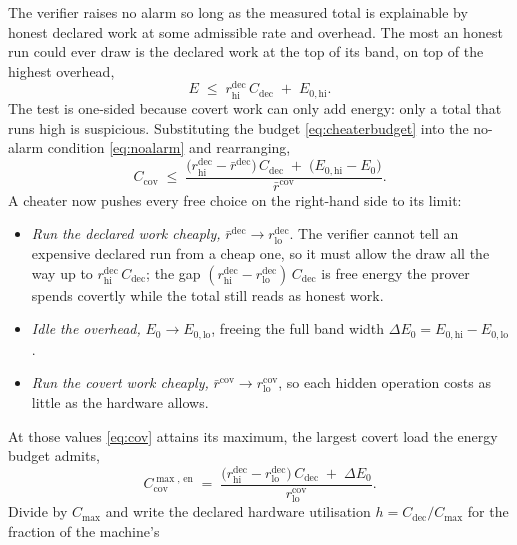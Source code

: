\documentclass{article}
\theoremstyle{plain}
\theoremstyle{definition}
\theoremstyle{remark}
\begin{document}
The verifier raises no alarm so long as the measured total is explainable by
honest declared work at some admissible rate and overhead. The most an
honest run could ever draw is the declared work at the top of its band, on
top of the highest overhead,
\begin{equation}
	E \;\le\; r_{\mathrm{hi}}^{\mathrm{dec}}\,C_{\mathrm{dec}} \;+\; E_{0,\mathrm{hi}}.
	\label{eq:noalarm}
\end{equation}
The test is one-sided because covert work can only add energy: only a
total that runs high is suspicious.
Substituting the budget \cref{eq:cheaterbudget} into the no-alarm condition
\cref{eq:noalarm} and rearranging,
\begin{equation}
	C_{\mathrm{cov}}
	\;\le\; \frac{\bigl(r_{\mathrm{hi}}^{\mathrm{dec}} - \bar r^{\mathrm{dec}}\bigr)\,C_{\mathrm{dec}}
	          \;+\; \bigl(E_{0,\mathrm{hi}} - E_0\bigr)}{\bar r^{\mathrm{cov}}}.
	\label{eq:cov}
\end{equation}
A cheater now pushes every free choice on the right-hand side to its limit:
\begin{itemize}
	\item \emph{Run the declared work cheaply,}
	$\bar r^{\mathrm{dec}} \to r_{\mathrm{lo}}^{\mathrm{dec}}$. The verifier
	cannot tell an expensive declared run from a cheap one, so it must allow
	the draw all the way up to $r_{\mathrm{hi}}^{\mathrm{dec}}\,C_{\mathrm{dec}}$;
	the gap
	$(r_{\mathrm{hi}}^{\mathrm{dec}} - r_{\mathrm{lo}}^{\mathrm{dec}})\,C_{\mathrm{dec}}$
	is free energy the prover spends covertly while the total still reads as
	honest work.
	\item \emph{Idle the overhead,} $E_0 \to E_{0,\mathrm{lo}}$, freeing the
	full band width $\Delta E_0 = E_{0,\mathrm{hi}} - E_{0,\mathrm{lo}}$.
	\item \emph{Run the covert work cheaply,}
	$\bar r^{\mathrm{cov}} \to r_{\mathrm{lo}}^{\mathrm{cov}}$, so each hidden
	operation costs as little as the hardware allows.
\end{itemize}
At those values \cref{eq:cov} attains its maximum, the largest covert load
the energy budget admits,
\begin{equation}
	C_{\mathrm{cov}}^{\max,\,\mathrm{en}} \;=\;
	\frac{\bigl(r_{\mathrm{hi}}^{\mathrm{dec}} - r_{\mathrm{lo}}^{\mathrm{dec}}\bigr)\,C_{\mathrm{dec}}
	      \;+\; \Delta E_0}{r_{\mathrm{lo}}^{\mathrm{cov}}}.
	\label{eq:covmax}
\end{equation}
Divide by $C_{\max}$ and write the declared hardware utilisation
$h = C_{\mathrm{dec}}/C_{\max}$ for the fraction of the machine's
\end{document}
